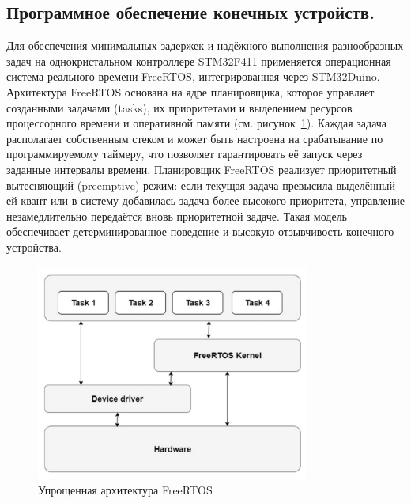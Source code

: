 \documentclass[a4paper,12pt]{article}
\begin{document}

\subsection{Программное обеспечение конечных устройств.}

Для обеспечения минимальных задержек и надёжного выполнения разнообразных задач на однокристальном контроллере STM32F411 применяется операционная система реального времени FreeRTOS,
интегрированная через STM32Duino. Архитектура FreeRTOS основана на ядре планировщика, которое управляет созданными задачами (tasks), их приоритетами и выделением ресурсов процессорного
времени и оперативной памяти (см. рисунок~\ref{fig:simple_arch_of_FreeRTOS}). Каждая задача располагает собственным стеком и может быть настроена на срабатывание по программируемому
таймеру, что позволяет гарантировать её запуск через заданные интервалы времени. Планировщик FreeRTOS реализует приоритетный вытесняющий (preemptive) режим: если текущая задача
превысила выделённый ей квант или в систему добавилась задача более высокого приоритета, управление незамедлительно передаётся вновь приоритетной задаче. Такая модель обеспечивает
детерминированное поведение и высокую отзывчивость конечного устройства.

\begin{figure}[H]
    \centering
    \includegraphics[width=0.8\textwidth]{images/FreeRTOS_arch.png}
    \caption{Упрощенная архитектура FreeRTOS \cite{IMG_RTOS_architectures}}
    \label{fig:simple_arch_of_FreeRTOS}
\end{figure}
\end{document}
